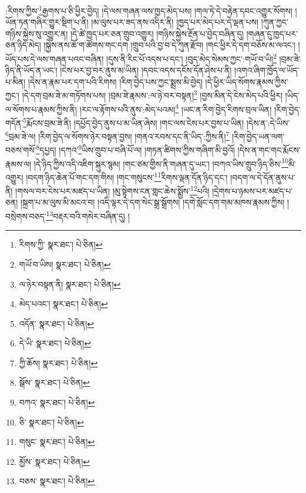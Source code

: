:རིགས་ཀྱིས་\footnote{རིགས་ཀྱི་  སྣར་ཐང་།  པེ་ཅིན། }རྒྱགས་པ་ཅི་ཕྱིར་བྱེད། །དེ་ལས་གཞན་ལས་ཁྱད་མེད་པས། །གལ་ཏེ་དེ་བརྟེན་དབང་འགྱུར་སོགས། །ཡོན་ཏན་གཞིར་གྱུར་སྡིག་པ་ནི། །མ་ལུས་པར་ཟད་ནས་འདིར་ནི། །ཁྱད་པར་མེད་པར་དེ་ལྡན་པས། །ཀུན་ཀྱང་གཉིས་སྐྱེས་སུ་འགྱུར་ན། །དེ་ཚེ་ཁྱད་པར་ཅན་གྲུབ་འགྱུར། །གཉིས་སྐྱེས་རྔོན་པ་བྱེད་བཞིན་དུ། །གཞན་དུ་ཁྱད་པར་ཅན་ཉིད་མེད། །སྐྱེས་ནས་ཆོ་ག་ཚོགས་གང་དག །གྲུབ་པའི་བྱ་བ་དེ་ཀུན་རྫོབ། །གང་ཕྱིར་དེ་དག་བཅོས་མ་ལའང་། །ཡོད་པས་དེ་ལས་གཞན་པའང་བཞིན། །དུས་ནི་རིང་པོ་འདས་པ་དང་། །བུད་མེད་སེམས་ཀྱང་:གཡོ་བ་ཡི།\footnote{གཡོ་བ་ཡིས།  སྣར་ཐང་།  པེ་ཅིན། } །བྲམ་ཟེ་ཉིད་ནི་ཡོད་ན་ཡང་། །ངེས་པར་བྱ་བར་ནུས་མ་ཡིན། །དབང་འདས་དངོས་དོན་ཤེས་པ་ནི། །འགའ་ཞིག་ཁྱོད་ལ་ཡོད་པ་མིན། །དེས་ན་རྣམ་པར་དག་པའི་རིགས། །རིག་བྱེད་པས་ཀྱང་སྨྲས་མི་བྱེད། །དེ་ཕྱིར་ཡིད་སོགས་རྣམས་ཀྱིས་ཀྱང་། །དེ་དག་བྲམ་ཟེ་མ་གཏོགས་པས། །བྲམ་ཟེ་རྣམས་:ལ་ཉེ་བར་བསྟན།\footnote{ལ་ཉེར་བསྟན་ནི།  སྣར་ཐང་།  པེ་ཅིན། } །བྱས་མིན་དེ་ངེས་མེད་པའི་ཕྱིར། །ཡིད་ལ་སོགས་པ་རྣམས་ཀྱིས་ནི། །རང་ལ་རྟོགས་པའི་ནུས་:མེད་པའམ།\footnote{མེད་པའང་།  སྣར་ཐང་།  པེ་ཅིན། } །ཡང་ན་རིག་བྱེད་རིགས་བྲལ་ཡིན། །རིག་བྱེད་གདོན་\footnote{འདོན་  སྣར་ཐང་།  པེ་ཅིན། }རྨོངས་བྲམ་ཟེ་ནི། །དཔྱོད་བྱེད་ནུས་པ་མ་ཡིན་ཞེས། །གང་ལས་ངེས་པར་བྱས་པ་ཡིན། །དེས་ན་:དེ་ཡིས་\footnote{དེ་ཡི་  སྣར་ཐང་།  པེ་ཅིན། }བྲམ་ཟེ་ལ། །རིག་བྱེད་ལ་སོགས་ཉེར་བསྟན་བྱས། །གནའ་རབས་དང་ནི་ཡིད་:ཀྱིས་ནི།\footnote{ཀྱི་ཆོས།  སྣར་ཐང་།  པེ་ཅིན། } །རིག་བྱེད་ཡན་ལག་བཅས་གསོ་\footnote{སྒོས་  སྣར་ཐང་།  པེ་ཅིན། }དཔྱད། །དཀའ་\footnote{བཀའ་  སྣར་ཐང་།  པེ་ཅིན། }ཡིས་གྲུབ་པ་བཞི་པོ་ལ། །གཏན་ཚིགས་ཀྱིས་གཞིག་མི་བྱའོ། །དེས་ན་གང་གང་རྨོངས་རྣམས་ལ། །དེ་ཉིད་ཀྱིས་འདི་འཇིག་སྐུར་སྙམ། །གང་ཙམ་གྱིས་ནི་གཞན་དུ་ཡང་། །བཀའ་ཡིས་གྲུབ་ཉིད་ཅིས་\footnote{ཅི་  སྣར་ཐང་།  པེ་ཅིན། }མི་འགྱུར། །བདག་ཉིད་ཆེན་པོ་གང་དག་གིས། །གང་གསུངས་\footnote{གསུང་  སྣར་ཐང་།  པེ་ཅིན། }རིགས་ལྡན་དོན་ཉིད་དང་། །བདག་ལ་དེ་དོན་ནུས་པ་ནི། །གསལ་བར་ངེས་པར་མཛད་པ་ཡིན། །མུ་སྟེགས་ངན་གླང་ཆེས་སྨྱོས་\footnote{མྱོས་  སྣར་ཐང་།  པེ་ཅིན། }པའི། །དྲེགས་པ་ཉམས་པར་མཛད་པ་ཅན། །སྐྲག་པ་མ་ལུས་མི་མངའ་བ། །འདི་ལྟར་དེ་དག་སེང་སྒྲ་སྒྲོགས། །དགེ་སློང་དག་གམ་མཁས་རྣམས་ཀྱིས། །བསྲེགས་བཅད་\footnote{བཅས་  སྣར་ཐང་།  པེ་ཅིན། }བརྡར་བའི་གསེར་བཞིན་དུ། །
